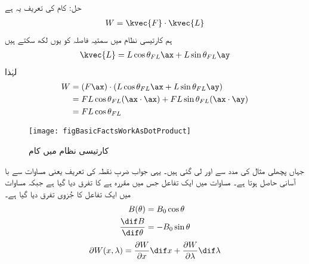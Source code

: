	حل:
	کام   کی تعریف یہ ہے
\begin{align}
W=\kvec{F} \cdot \kvec{L}
\end{align}
ہم کارتیسی نظام میں سمتیہ فاصلہ کو یوں لکھ سکتے ہیں
\begin{align}
\kvec{L}=L \cos \theta_{FL} \ax +L \sin \theta_{FL} \ay
\end{align}
لہٰذا
\begin{gather}
\begin{aligned}
W &= (F \ax) \cdot (L \cos \theta_{FL} \ax +L \sin \theta_{FL} \ay)\\
&=F L \cos \theta_{FL} (\ax \cdot \ax)+ F L \sin \theta_{FL} (\ax \cdot \ay)\\
&= F L \cos \theta_{FL}
\end{aligned}
\end{gather}
%
\begin{figure}
\centering
\texttt{[image: figBasicFactsWorkAsDotProduct]}
\caption{کارتیسی نظام میں کام}
\label{شکل_حقائق_کارتیسی_کام}
\end{figure}
جہاں پچھلی مثال کی مدد سے  اور  لی گئی ہیں۔ یہی جواب ضربِ نقطہ کی تعریف یعنی مساوات  سے با آسانی حاصل ہوتا ہے۔
%
مساوات  میں ایک تفاعل جس میں مقررہ ہے کا تفرق دیا گیا ہے جبکہ مساوات   میں ایک تفاعل کا جُزوی تفرق  دیا گیا ہے۔
\begin{gather}
\begin{aligned}\label{مساوات_بنیادی_تفرق}
B (\theta )&=B_0 \cos \theta\\
\frac{\dif B}{\dif \theta}&=-B_0 \sin \theta
\end{aligned}
\end{gather} 
%
\begin{align}\label{مساوات_بنیادی_جزوی_تفرق}
\partial W(x,\lambda)=\frac{\partial W}{\partial x} \dif x+\frac{\partial W}{\partial \lambda} \dif \lambda
\end{align}

